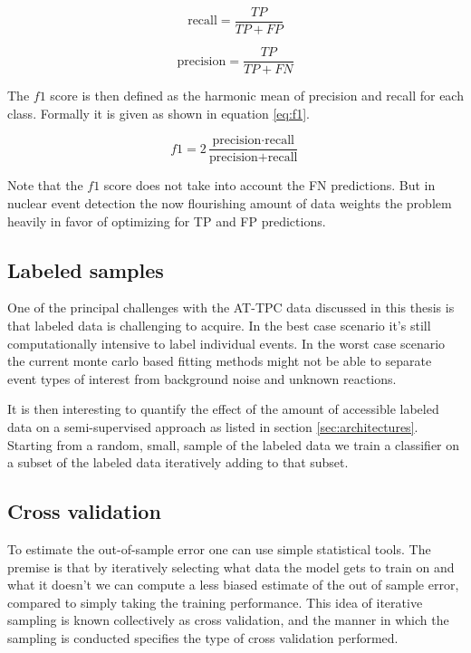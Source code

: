 \begin{equation}\label{eq:recall}
\text{recall}= \frac{TP}{TP + FP}
\end{equation}

\begin{equation}\label{eq:precision}
\text{precision} = \frac{TP}{TP + FN}
\end{equation}

\noindent The $f1$ score is then defined as the harmonic mean of precision and recall for each class. Formally it is given as shown in equation \ref{eq:f1}.

\begin{equation}\label{eq:f1}
f1 = 2 \frac{\text{precision} \cdot \text{recall}}{\text{precision} + \text{recall}}
\end{equation}

\noindent Note that the $f1$ score does not take into account the FN predictions. But in nuclear event detection the now flourishing amount of data weights the problem heavily in favor of optimizing for TP and FP predictions. 

\subsection{Labeled samples}

One of the principal challenges with the AT-TPC data discussed in this thesis is that labeled data is challenging to acquire. In the best case scenario it's still computationally intensive to label individual events. In the worst case scenario the current monte carlo based fitting methods might not be able to separate event types of interest from background noise and unknown reactions.

It is then interesting to quantify the effect of the amount of accessible labeled data on a semi-supervised approach as listed in section \ref{sec:architectures}. Starting from a random, small, sample of the labeled data we train a classifier on a subset of the labeled data iteratively adding to that subset. 


\subsection{Cross validation}

To estimate the out-of-sample error one can use simple statistical tools. The premise is that by iteratively selecting what data the model gets to train on and what it doesn't we can compute a less biased estimate of the out of sample error, compared to simply taking the training performance. This idea of iterative sampling is known collectively as cross validation, and the manner in which the sampling is conducted specifies the type of cross validation performed. 